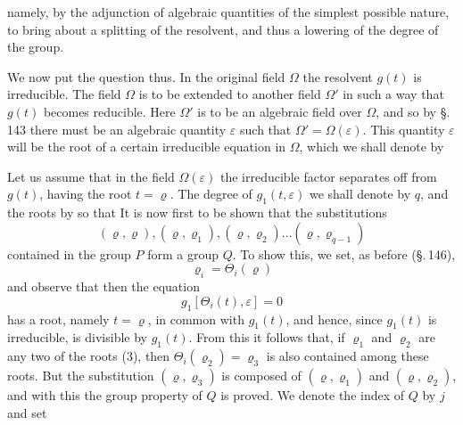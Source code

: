 namely, by the adjunction of algebraic quantities of the simplest
possible nature, to bring about a splitting of the  resolvent,
and thus a lowering of the degree of the group.

We now put the question thus. In the original
field $\Omega$ the  resolvent $g(t)$ is irreducible. The
field $\Omega$ is to be extended to another field $\Omega'$ in such a way
that $g(t)$ becomes reducible. Here $\Omega'$ is to be an algebraic field
over $\Omega$, and so by \S.\,143 there must be an algebraic
quantity $\varepsilon$ such that $\Omega' = \Omega(\varepsilon)$. This quantity $\varepsilon$ will be the
root of a certain irreducible equation in $\Omega$, which
we shall denote by

Let us assume that in the field $\Omega(\varepsilon)$ the irreducible
factor
separates off from $g(t)$, having the root $t = \varrho$. The degree of $g_1(t, \varepsilon)$ we shall
denote by $q$, and the roots by
so that
It is now first to be shown that the substitutions
\[ (\varrho, \varrho), (\varrho, \varrho_1), (\varrho, \varrho_2) \ldots (\varrho, \varrho_{q-1}) \]
contained in the group $P$ form a group $Q$. To show this, we set, as
before (\S.\,146),
\[ \varrho_i = \Theta_i(\varrho) \]
and observe that then the equation
\[ g_1[\Theta_i(t), \varepsilon] = 0 \]
has a root, namely $t = \varrho$, in common with $g_1(t)$, and hence,
since $g_1(t)$ is irreducible, is divisible by $g_1(t)$. From this it follows
that, if $\varrho_1$ and $\varrho_2$ are any two of the roots (3), then
$\Theta_i(\varrho_2) = \varrho_3$ is also contained among these roots. But the
substitution $(\varrho, \varrho_3)$ is composed of $(\varrho, \varrho_1)$ and $(\varrho, \varrho_2)$, and
with this the group property of $Q$ is proved. We denote the index of $Q$ by $j$ and set
